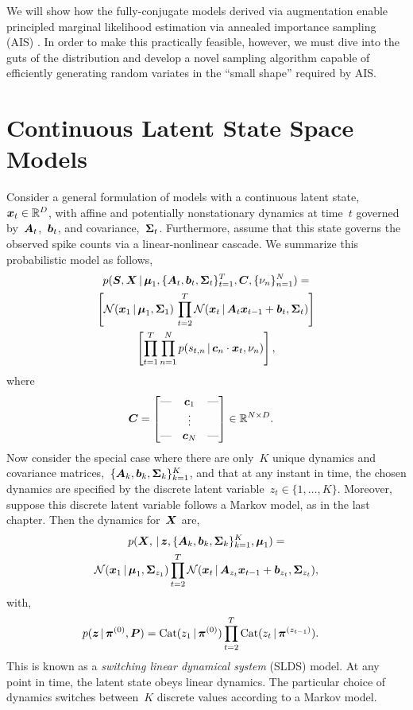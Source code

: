 We will show how the fully-conjugate models derived via \polyagamma
augmentation enable principled marginal likelihood estimation
via annealed importance sampling (AIS) \citep{neal2001annealed}. In order
to make this practically feasible, however, we must dive into the
guts of the \polyagamma distribution and develop a novel sampling
algorithm capable of efficiently generating random variates in the
``small shape'' required by AIS. 
 
 
\section{Continuous Latent State Space Models}
Consider a general formulation of models with a continuous latent
state,~$\boldsymbol{x}_t \in \mathbb{R}^D$, with affine and potentially nonstationary
dynamics at time~$t$ governed by~$\boldsymbol{A}_t$,~$\boldsymbol{b}_t$, and
covariance,~$\boldsymbol{\Sigma}_t$. Furthermore, assume that this state
governs the observed spike counts via a linear-nonlinear cascade.  We
summarize this probabilistic model as follows,
\begin{multline}
  p(\boldsymbol{S}, \boldsymbol{X} \,|\,  \boldsymbol{\mu}_1, \{\boldsymbol{A}_t, \boldsymbol{b}_t, \boldsymbol{\Sigma}_t\}_{t=1}^T, \boldsymbol{C}, \{\nu_n\}_{n=1}^N)
  = \\
  \left[
    \mathcal{N}(\boldsymbol{x}_1 \,|\, \boldsymbol{\mu}_1, \boldsymbol{\Sigma}_1) \,
    \prod_{t=2}^T \mathcal{N}(\boldsymbol{x}_t \,|\, \boldsymbol{A}_t \boldsymbol{x}_{t-1} + \boldsymbol{b}_t, \boldsymbol{\Sigma}_t)
  \right] \\
  \left[
    \prod_{t=1}^T \prod_{n=1}^N p(s_{t,n} \,|\, \boldsymbol{c}_n \cdot \boldsymbol{x}_t, \nu_n)
  \right],
\end{multline}
where
\begin{align*}
  \boldsymbol{C} &=
        \begin{bmatrix}
          \text{---} &  \boldsymbol{c}_1  & \text{---} \\
            &  \vdots &   \\
          \text{---} &  \boldsymbol{c}_N  & \text{---}
        \end{bmatrix} \in \mathbb{R}^{N \times D}.
\end{align*}
Now consider the special case where there are only~$K$ unique dynamics
and covariance matrices,~${\{\boldsymbol{A}_k, \boldsymbol{b}_k, \boldsymbol{\Sigma}_k\}_{k=1}^K}$, and that at
any instant in time, the chosen dynamics are specified by the
discrete latent variable~${z_t \in \{1, \ldots, K\}}$. Moreover,
suppose this discrete latent variable follows a Markov model,
as in the last chapter. Then the dynamics for~$\boldsymbol{X}$
are,
\begin{multline}
  p(\boldsymbol{X}, \,|\, \boldsymbol{z}, \{\boldsymbol{A}_k, \boldsymbol{b}_k, \boldsymbol{\Sigma}_k\}_{k=1}^K, \boldsymbol{\mu}_1)
  = \\ 
    \mathcal{N}(\boldsymbol{x}_1 \,|\, \boldsymbol{\mu}_1, \boldsymbol{\Sigma}_{z_1})
    \prod_{t=2}^T \mathcal{N}(\boldsymbol{x}_t \,|\, \boldsymbol{A}_{z_t} \boldsymbol{x}_{t-1} + \boldsymbol{b}_{z_t}, \boldsymbol{\Sigma}_{z_t}),
\end{multline}
with,
\begin{align*}
  p(\boldsymbol{z} \,|\, \boldsymbol{\pi}^{(0)}, \boldsymbol{P}) &=
  \mathrm{Cat}(z_1\,|\, \boldsymbol{\pi}^{(0)})
  \prod_{t=2}^T \mathrm{Cat}(z_t \,|\, \boldsymbol{\pi}^{(z_{t-1})}).
\end{align*}
This is known as a \emph{switching linear dynamical system} (SLDS)
model. At any point in time, the latent state obeys linear dynamics.
The particular choice of dynamics switches between~$K$ discrete values
according to a Markov model.

